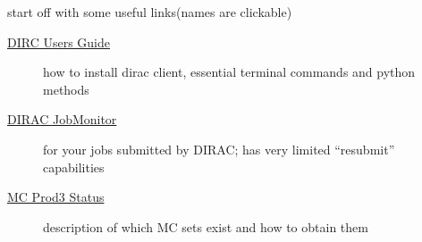 \documentclass{beamer}
\begin{document}
\begin{frame}
  \titlepage
\end{frame}


\begin{frame}{start off with some useful links}{(names are clickable)}
    \begin{description}
        \item[\href{https://forge.in2p3.fr/projects/cta_dirac/wiki/CTA-DIRAC_Users_Guide}
                    {DIRC Users Guide}]
            how to install dirac client, essential terminal commands and python methods
            \bigskip
        \item[\href{https://ccdcta-web.in2p3.fr/DIRAC/s:CTA/g:cta_user/?view=tabs&theme=
                    Grey&url_state=1|*DIRAC.JobMonitor.classes.JobMonitor:,}
                    {DIRAC JobMonitor}]
            for your jobs submitted by DIRAC; has very limited ``resubmit'' capabilities
            \bigskip
        \item[\href{https://forge.in2p3.fr/projects/cta_dirac/wiki/
                    CTA-DIRAC_MC_PROD3_Status}
                    {MC Prod3 Status}]
            description of which MC sets exist and how to obtain them
    \end{description}
\end{frame}
\end{document}
